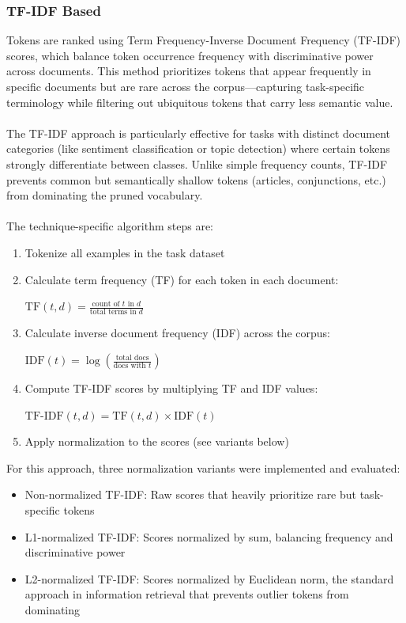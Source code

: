 \documentclass[twocolumn]{article}
\begin{document}
\subsubsection{TF-IDF Based}
Tokens are ranked using Term Frequency-Inverse Document Frequency (TF-IDF) scores, which balance token occurrence frequency with discriminative power across documents. This method prioritizes tokens that appear frequently in specific documents but are rare across the corpus—capturing task-specific terminology while filtering out ubiquitous tokens that carry less semantic value.
\\ \\
The TF-IDF approach is particularly effective for tasks with distinct document categories (like sentiment classification or topic detection) where certain tokens strongly differentiate between classes. Unlike simple frequency counts, TF-IDF prevents common but semantically shallow tokens (articles, conjunctions, etc.) from dominating the pruned vocabulary.
\\ \\
The technique-specific algorithm steps are:
\begin{enumerate}
    \item Tokenize all examples in the task dataset
    \item Calculate term frequency (TF) for each token in each document:
        \begin{center}
        $\text{TF}(t,d) = \frac{\text{count of $t$ in $d$}}{\text{total terms in $d$}}$
        \end{center}
    \item Calculate inverse document frequency (IDF) across the corpus:
        \begin{center}
        $\text{IDF}(t) = \log\left(\frac{\text{total docs}}{\text{docs with $t$}}\right)$
        \end{center}
    \item Compute TF-IDF scores by multiplying TF and IDF values:
        \begin{center}
        $\text{TF-IDF}(t,d) = \text{TF}(t,d) \times \text{IDF}(t)$
        \end{center}
    \item Apply normalization to the scores (see variants below)
\end{enumerate}
For this approach, three normalization variants were implemented and evaluated:
\begin{itemize}
    \item Non-normalized TF-IDF: Raw scores that heavily prioritize rare but task-specific tokens
    \item L1-normalized TF-IDF: Scores normalized by sum, balancing frequency and discriminative power
    \item L2-normalized TF-IDF: Scores normalized by Euclidean norm, the standard approach in information retrieval that prevents outlier tokens from dominating
\end{itemize}
\end{document}

